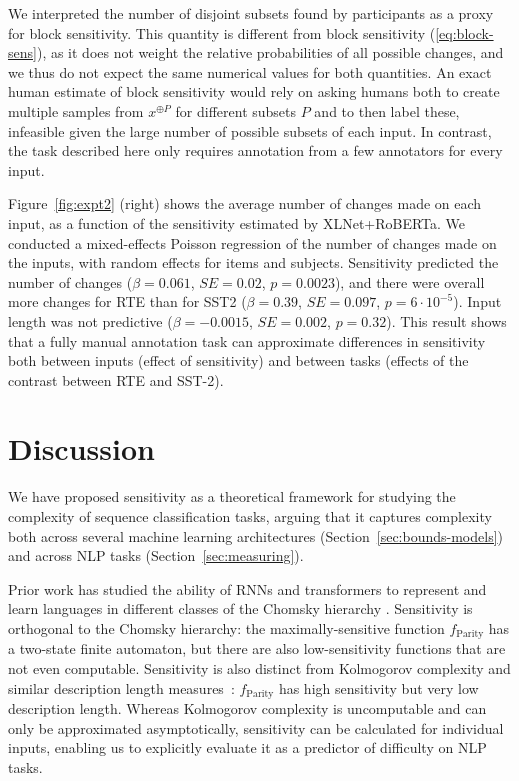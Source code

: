 \documentclass[11pt,a4paper]{article}
\begin{document}
We interpreted the number of disjoint subsets found by participants as a proxy for block sensitivity.
This quantity is different from block sensitivity (\ref{eq:block-sens}), as it does not weight the relative probabilities of all possible changes, and we thus do not expect the same numerical values for both quantities.
An exact human estimate of block sensitivity would rely on asking humans both to create multiple samples from $x^{\oplus P}$ for different subsets $P$ and to then label these, infeasible given the large number of possible subsets of each input.
In contrast, the task described here only requires annotation from a few annotators for every input.

Figure~\ref{fig:expt2} (right) shows the average number of changes made on each input, as a function of the sensitivity estimated by XLNet+RoBERTa.
We conducted a mixed-effects Poisson regression of the number of changes made on the inputs, with random effects for items and subjects.
Sensitivity predicted the number of changes ($\beta = 0.061$, $SE=0.02$, $p=0.0023$), and there were overall more changes for RTE than for SST2 ($\beta=0.39$, $SE=0.097$, $p = 6\cdot 10^{-5}$).
Input length was not predictive ($\beta=-0.0015$, $SE=0.002$, $p=0.32$).
This result shows that a fully manual annotation task can approximate differences in sensitivity both between inputs (effect of sensitivity) and between tasks (effects of the contrast between RTE and SST-2).



\section{Discussion}
\label{sec:discussion}

We have proposed sensitivity as a theoretical framework for studying the complexity of sequence classification tasks, arguing that it captures complexity both across several machine learning architectures (Section~\ref{sec:bounds-models}) and across NLP tasks (Section~\ref{sec:measuring}).

Prior work has studied the ability of  RNNs and transformers to represent and learn languages in different classes of the Chomsky hierarchy \citep[e.g.,][]{merrill2019sequential}.
Sensitivity is orthogonal to the Chomsky hierarchy:
the maximally-sensitive function $f_{\text{Parity}}$ has a two-state finite automaton, but there are also low-sensitivity functions that are not even computable.
Sensitivity is also distinct from Kolmogorov complexity and similar description length measures~\citep{li1993an}: $f_\text{Parity}$ has high sensitivity but very low description length.
Whereas Kolmogorov complexity is uncomputable and can only be approximated asymptotically, sensitivity can be calculated for individual inputs, enabling us to explicitly evaluate it as a predictor of difficulty on NLP tasks.
\end{document}

